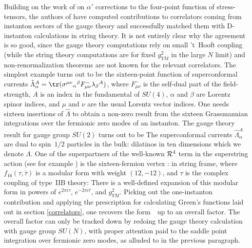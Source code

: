 Building on the work of \cite{Banks:1998nr} on $\alpha'$ corrections to the
four-point function of stress-tensors, the authors of \cite{Bianchi:1998nk}
have computed contributions to correlators coming from instanton sectors of
the gauge theory and successfully matched them with D-instanton
calculations in string theory.  It is not entirely clear why the agreement
is so good, since the gauge theory computations rely on small 't~Hooft
coupling (while the string theory computations are for fixed $g_{YM}^2$ in
the large $N$ limit)
and non-renormalization theorems are not known for the relevant
correlators.  The simplest example turns out to be the sixteen-point
function of superconformal currents $\hat{\Lambda}^A_\alpha =
\tr(\sigma^{\mu\nu}{}_\alpha{}^\beta F^-_{\mu\nu} \lambda_\beta{}^A)$,
where $F^-_{\mu\nu}$ is the self-dual part of the field-strength, $A$ is an
index in the fundamental of $SU(4)$, $\alpha$ and $\beta$ are Lorentz
spinor indices, and $\mu$ and $\nu$ are the usual Lorentz vector indices.
One needs sixteen insertions of $\hat\Lambda$ to obtain a non-zero result
from the sixteen Grassmannian integrations over the fermionic zero modes of
an instanton.  The gauge theory result for gauge group $SU(2)$ turns out to
be
 The superconformal currents $\hat{\Lambda}^A_\alpha$ are dual to
spin~$1/2$ particles in the bulk: dilatinos in ten dimensions which we
denote $\Lambda$.  One of the superpartners of the well-known 
${\cal R}^4$ term in
the superstring action (see for example \cite{Green:1997tv}) is the
sixteen-fermion vertex \cite{Green:1998me}: in string frame,
 where $f_{16}(\tau,\bar\tau)$ is a modular form with weight $(12,-12)$,
and $\tau$ is the complex coupling of type~IIB theory: 
 There is a well-defined expansion of this modular form in powers of
$e^{2\pi i \tau}$, $e^{-2\pi i \bar\tau}$, and $g_{YM}^2$.  Picking out the
one-instanton contribution and applying the prescription for calculating
Green's functions laid out in section \ref{correlators},
one recovers the form~\SixteenAnswer\ up to an overall factor.  The overall
factor can only be tracked down by redoing the gauge theory calculation
with gauge group $SU(N)$, with proper attention paid to the saddle point
integration over fermionic zero modes, as alluded to in the previous
paragraph.


